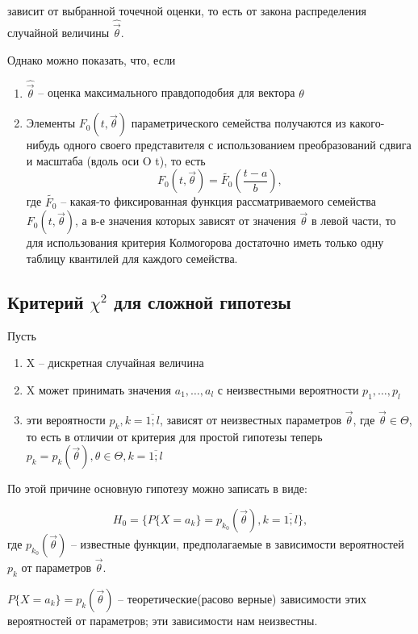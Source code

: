 \documentclass[a4paper, 12pt]{article}
\theoremstyle{definition}
\theoremstyle{leads}
\theoremstyle{example}
\theoremstyle{remark}
\begin{document}
зависит от выбранной точечной оценки, то есть от закона распределения случайной величины $\hat{\vec{\theta}}$.

Однако можно показать, что, если 

\begin{enumerate}
	\item  $\hat{\vec{\theta}}$ -- оценка максимального правдоподобия для вектора $\theta$
	\item Элементы $F_0(t, \vec{\theta})$ параметрического семейства получаются из какого-нибудь одного своего представителя с использованием преобразований сдвига и масштаба (вдоль оси O t), то есть 
	\begin{equation*}
		F_0(t, \vec{\theta}) = \tilde{F_0}(\frac{t - a}{b}),
	\end{equation*}
	где  $\tilde{F_0}$ -- какая-то фиксированная функция рассматриваемого семейства $F_0(t, \vec{\theta})$, а в-е значения которых зависят от значения $\vec{\theta}$  в левой части, то для использования критерия Колмогорова достаточно иметь только  одну таблицу квантилей для каждого семейства.
\end{enumerate}

\subsection{Критерий $\chi^2$ для сложной гипотезы}
Пусть 
\begin{enumerate}
	\item X -- дискретная случайная величина
	\item X может принимать значения $a_1, \dots, a_l$ с неизвестными вероятности $p_1, \dots, p_l$
	\item эти вероятности $p_k, k = \overline{1; l}$, зависят от неизвестных параметров $\vec{\theta}$, где $\vec{\theta} \in \Theta$, то есть в отличии от критерия для простой гипотезы теперь $p_k = p_k(\vec{\theta}), \theta \in \Theta, k = \overline{1; l}$ 
\end{enumerate}

По этой причине основную гипотезу можно записать в виде:

\begin{equation}
	H_0 = \{P\{X = a_k\} = p_{k_0}(\vec{\theta}), k = \overline{1; l}\}, 
\end{equation}
где $p_{k_0}(\vec{\theta})$ -- известные функции, предполагаемые в зависимости вероятностей $p_k$ от параметров $\vec{\theta}$.

$P\{X = a_k\} = p_k(\vec{\theta})$ -- теоретические(расово верные) зависимости этих вероятностей от параметров; эти зависимости нам неизвестны.
\end{document}
